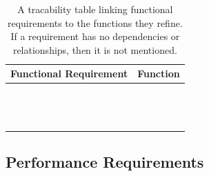 \documentclass{article}
\begin{document}
\begin{table}[!h]
\begin{center}
\caption {A tracability table linking functional requirements to the functions they refine. If a requirement has no dependencies or relationships, then it is not mentioned. }
\label{TRACE_FR_Func}
\begin{tabular}{ | m{7cm} | m{7cm} | }
\hline
Functional Requirement & Function  \\
\hline
\nameref{GEN_001} & \nameref{Autonomous Explore State}  \\
\hline
\nameref{STA_000} & \nameref{Idle State}  \\
\hline
\nameref{STA_001} & \nameref{Autonomous Explore State}  \\
\hline
\nameref{STA_002} & \nameref{Manual Move State}  \\
\hline
\nameref{STA_003} & \nameref{Autonomous Explore State}  \\
\hline
\nameref{STA_004} & \nameref{Configure State}  \\
\hline
\nameref{STA_005} & \nameref{Off State}  \\
\hline
\nameref{STA_006} & \nameref{Land State}  \\
\hline
\nameref{STA_007} & \nameref{Desired Location Error State}  \\
\hline
\nameref{STA_008} & \nameref{No Parking Lot Detected Error State}  \\
\hline
\nameref{STA_009} & \nameref{Malfunction State}  \\
\hline
\nameref{STA_010} & \nameref{Communication Lost State}  \\
\hline
\nameref{STA_011} & \nameref{Compulsive Move State}  \\
\hline
\end{tabular}
\end{center}
\end{table}

\clearpage
\newpage

\subsection{Performance Requirements}
\end{document}
